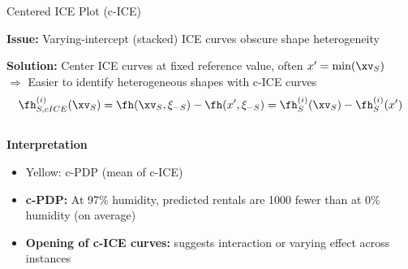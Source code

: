 \documentclass[11pt,compress,t,notes=noshow, aspectratio=169, xcolor=table]{beamer}
\begin{document}
\begin{frame}{Centered ICE Plot (c-ICE) }

\textbf{Issue:} Varying-intercept (stacked) ICE curves obscure shape heterogeneity

\textbf{Solution:} Center ICE curves at fixed reference value, often $x' = \min(\xv_S)$\\
$\Rightarrow$ Easier to identify heterogeneous shapes with c-ICE curves
$$\begin{aligned}
\fh_{S, cICE}^{(i)}(\xv_S) = \fh(\xv_S, \xi_{-S}) - \fh(x', \xi_{-S}) = \fh_{S}^{(i)}(\xv_S) - \fh_{S}^{(i)}(x')
\end{aligned}$$
\vspace{-0.2cm}
\begin{columns}[c, totalwidth=\textwidth]
\begin{column}{0.45\textwidth}
\pause
\textbf{Interpretation}%
\begin{itemize}
  \item Yellow: c-PDP (mean of c-ICE)
  \item \textbf{c-PDP:} At 97\% humidity, predicted rentals are 1000 fewer than at 0\% humidity (on average)
  \item \textbf{Opening of c-ICE curves:} suggests interaction or varying effect across instances
\end{itemize}
\end{column}
\begin{column}{0.55\textwidth}
\begin{center}

\end{center}
\end{column}
\end{columns}
\end{frame}
\end{document}
